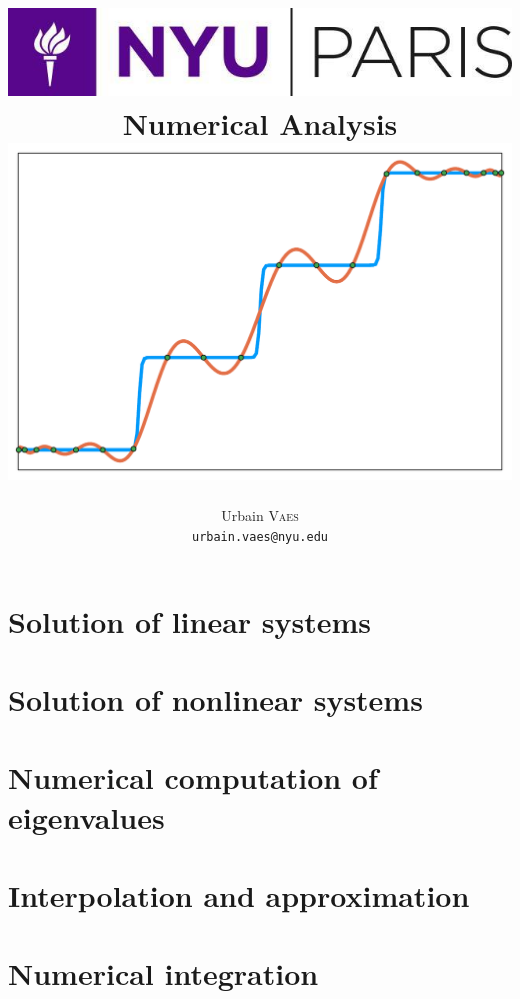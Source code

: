 \documentclass[11pt,a4paper,oneside]{book}
\title{
    \vspace{-2cm}
    \includegraphics[width=.3\textwidth]{figures/nyu-logo.jpg}\\
    \vspace{1.5cm}
    \textbf{Numerical Analysis} \\[1cm]
    \includegraphics[width=.7\textwidth]{figures/chebychev_cover.pdf}
}
\author{%
    Urbain \textsc{Vaes} \\
    \texttt{urbain.vaes@nyu.edu}
}
\date{\vspace{1cm} {\large\textsc{NYU Paris}, Spring term 2022} \\[2cm]
    \vfill
    \flushleft \textbf{Weekly schedule}:
    \begin{itemize}
        \item Lectures on Tuesday and Thursday afternoon (2 $\times$ 1h15);
        \item Recitation on Thursday afternoon (1h30);
        \item Office hour on Tuesday, after the lecture.
    \end{itemize}
}
\begin{document}
\dominitoc
\maketitle

\frontmatter


\tableofcontents

\mainmatter




\chapter{Solution of linear systems}
\label{cha:solution_of_linear_systems}

\chapter{Solution of nonlinear systems}
\label{cha:solution_of_nonlinear_systems}

\chapter{Numerical computation of eigenvalues}%
\label{cha:numerical_computation_of_eigenvalues}

\chapter{Interpolation and approximation}%
\label{cha:interpolation_and_approximation}

\chapter{Numerical integration}
\label{cha:quadrature}

\nocite{*}
\printbibliography
\end{document}
